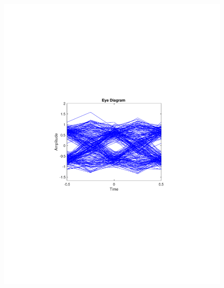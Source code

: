 \begin{refsection}
\begin{figure}[H]
\begin{minipage}{0.30\textwidth}
		\includegraphics[clip, trim=4cm 8cm 4cm 8cm, width=1\textwidth]{./sdf/m_qam_system/figures/expResults/homodyne/5_eye_4GBdInSig13dBc_AfPE.pdf}
		\label{fig:4GBdSpecPE1}
	\end{minipage}
	\begin{minipage}{0.30\textwidth}
		\centering

\end{minipage}
\end{figure}
\end{refsection}
